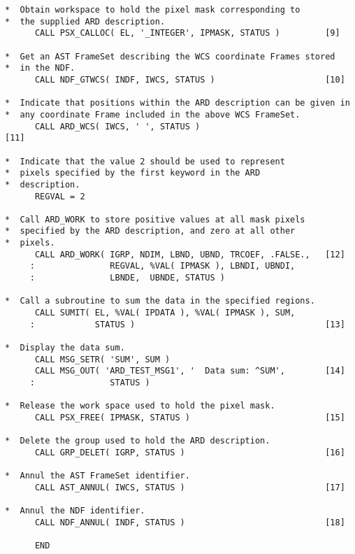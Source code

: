 \begin{verbatim}
*  Obtain workspace to hold the pixel mask corresponding to   
*  the supplied ARD description.                              
      CALL PSX_CALLOC( EL, '_INTEGER', IPMASK, STATUS )         [9]

*  Get an AST FrameSet describing the WCS coordinate Frames stored
*  in the NDF.
      CALL NDF_GTWCS( INDF, IWCS, STATUS )                      [10]

*  Indicate that positions within the ARD description can be given in
*  any coordinate Frame included in the above WCS FrameSet.
      CALL ARD_WCS( IWCS, ' ', STATUS )                              [11]

*  Indicate that the value 2 should be used to represent      
*  pixels specified by the first keyword in the ARD           
*  description.                                               
      REGVAL = 2                                              
                                                              
*  Call ARD_WORK to store positive values at all mask pixels  
*  specified by the ARD description, and zero at all other    
*  pixels.                                                    
      CALL ARD_WORK( IGRP, NDIM, LBND, UBND, TRCOEF, .FALSE.,   [12]
     :               REGVAL, %VAL( IPMASK ), LBNDI, UBNDI,    
     :               LBNDE,  UBNDE, STATUS )                  
                                                              
*  Call a subroutine to sum the data in the specified regions.
      CALL SUMIT( EL, %VAL( IPDATA ), %VAL( IPMASK ), SUM,    
     :            STATUS )                                      [13]
                                                              
*  Display the data sum.                                      
      CALL MSG_SETR( 'SUM', SUM )                             
      CALL MSG_OUT( 'ARD_TEST_MSG1', '  Data sum: ^SUM',        [14]
     :               STATUS )                                 
                                                              
*  Release the work space used to hold the pixel mask.        
      CALL PSX_FREE( IPMASK, STATUS )                           [15]
                                                              
*  Delete the group used to hold the ARD description.         
      CALL GRP_DELET( IGRP, STATUS )                            [16]
                                                              
*  Annul the AST FrameSet identifier.                                  
      CALL AST_ANNUL( IWCS, STATUS )                            [17]
                                                              
*  Annul the NDF identifier.                                  
      CALL NDF_ANNUL( INDF, STATUS )                            [18]
                                                              
      END                                                     
\end{verbatim}
\normalsize

